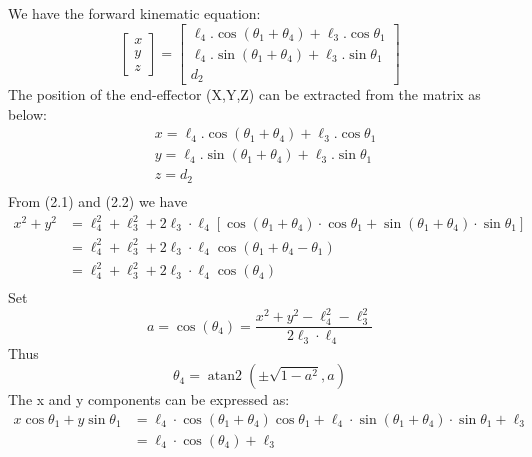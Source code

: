         We have the forward kinematic equation:
        \begin{equation*}
            \begin{bmatrix}
                x  \\
                y \\
                z 
                \end{bmatrix}
            = 
            \begin{bmatrix}
                \ell_4.\cos(\theta_1 + \theta_4) + \ell_3.\cos\theta_1 \\
                \ell_4.\sin(\theta_1 + \theta_4) + \ell_3.\sin\theta_1 \\
                d_2 
                \end{bmatrix}
        \end{equation*}
        The position of the end-effector (X,Y,Z) can be extracted from the matrix as below:
    \begin{align}
        &x = \ell_4.\cos(\theta_1 + \theta_4) + \ell_3.\cos\theta_1\\
        &y = \ell_4.\sin(\theta_1 + \theta_4) + \ell_3.\sin\theta_1\\
        &z = d_2 \\
    \end{align}
    From (2.1) and (2.2) we have
    \begin{align*}
        x^2 + y^2 &= \ell_4^2 + \ell_3^2 + 2 \ell_3 \cdot \ell_4 \left[ \cos(\theta_1 + \theta_4) \cdot \cos \theta_1 + \sin(\theta_1 + \theta_4) \cdot \sin \theta_1 \right] \\
        &= \ell_4^2 + \ell_3^2 + 2 \ell_3 \cdot \ell_4 \cos(\theta_1 + \theta_4 - \theta_1) \\
        &= \ell_4^2 + \ell_3^2 + 2 \ell_3 \cdot \ell_4 \cos(\theta_4) \\
    \end{align*}
    Set
    \begin{equation*}
        a = \cos(\theta_4) = \frac{x^2 + y^2 - \ell_4^2 - \ell_3^2}{2 \ell_3 \cdot \ell_4}
    \end{equation*}
    Thus
    \begin{equation*}
        \theta_4 = \operatorname{atan2}\left( \pm \sqrt{1 - a^2}, a \right)
    \end{equation*}
    The x and y components can be expressed as:
    \begin{align*}
        x \cos \theta_1 + y \sin \theta_1 &= \ell_4 \cdot \cos(\theta_1 + \theta_4) \cos \theta_1 + \ell_4 \cdot \sin(\theta_1 + \theta_4) \cdot \sin \theta_1 + \ell_3 \\
        &= \ell_4 \cdot \cos(\theta_4) + \ell_3 \\
    \end{align*}

